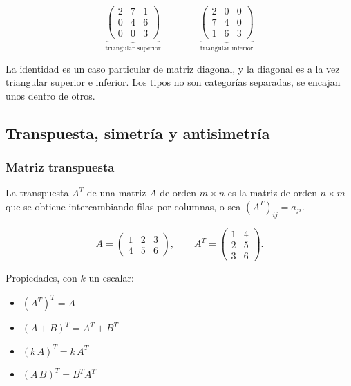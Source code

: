 \documentclass[11pt,letterpaper]{article}
\begin{document}
\[
    \underbrace{\begin{pmatrix}
        2 & 7 & 1 \\ 0 & 4 & 6 \\ 0 & 0 & 3
    \end{pmatrix}}_{\text{triangular superior}}
    \qquad\qquad
    \underbrace{\begin{pmatrix}
        2 & 0 & 0 \\ 7 & 4 & 0 \\ 1 & 6 & 3
    \end{pmatrix}}_{\text{triangular inferior}}
\]

\begin{ojo}
    La identidad es un caso particular de matriz diagonal, y la
    diagonal es a la vez triangular superior e inferior. Los tipos no
    son categorías separadas, se encajan unos dentro de otros.
\end{ojo}


\subsection*{Transpuesta, simetría y antisimetría}

\subsubsection*{Matriz transpuesta}

\begin{definicion}[Transpuesta]
    La transpuesta $A^{T}$ de una matriz $A$ de orden $m \times n$ es
    la matriz de orden $n \times m$ que se obtiene intercambiando
    filas por columnas, o sea $(A^{T})_{ij} = a_{ji}$.
\end{definicion}

\[
    A = \begin{pmatrix} 1 & 2 & 3 \\ 4 & 5 & 6 \end{pmatrix} ,
    \qquad
    A^{T} = \begin{pmatrix} 1 & 4 \\ 2 & 5 \\ 3 & 6 \end{pmatrix} .
\]

Propiedades, con $k$ un escalar:

\begin{itemize}[itemsep=0.1em]
    \item $(A^{T})^{T} = A$
    \item $(A + B)^{T} = A^{T} + B^{T}$
    \item $(k\,A)^{T} = k\,A^{T}$
    \item $(A\,B)^{T} = B^{T} A^{T}$
\end{itemize}
\end{document}
